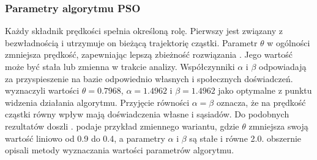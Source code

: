 \subsubsection{Parametry algorytmu PSO}
Każdy składnik prędkości spełnia określoną rolę. Pierwszy jest związany z bezwładnością i utrzymuje on bieżącą trajektorię cząstki. Parametr $\theta$ w ogólności zmniejsza prędkość, zapewniając lepszą zbieżność rozwiązania \parencite{Blackwell2019}. Jego wartość może być stała lub zmienna w trakcie analizy. Współczynniki $\alpha$ i $\beta$ odpowiadają za przyspieszenie na bazie odpowiednio własnych i społecznych doświadczeń. 
\cite{Clerc2002} wyznaczyli wartości $\theta=0.7968$, $\alpha=1.4962$ i $\beta=1.4962$ jako optymalne z punktu widzenia działania algorytmu. Przyjęcie równości $\alpha=\beta$ oznacza, że na prędkość cząstki równy wpływ mają doświadczenia własne i sąsiadów. Do podobnych rezultatów doszli \cite{Shi1998}. \cite{Xu2007} podaje przykład zmiennego wariantu, gdzie $\theta$ zmniejsza swoją wartość liniowo od 0.9 do 0.4, a parametry $\alpha$ i $\beta$ są stałe i równe 2.0. \cite{Poli2007} obszernie opisali metody wyznaczania wartości parametrów algorytmu.
